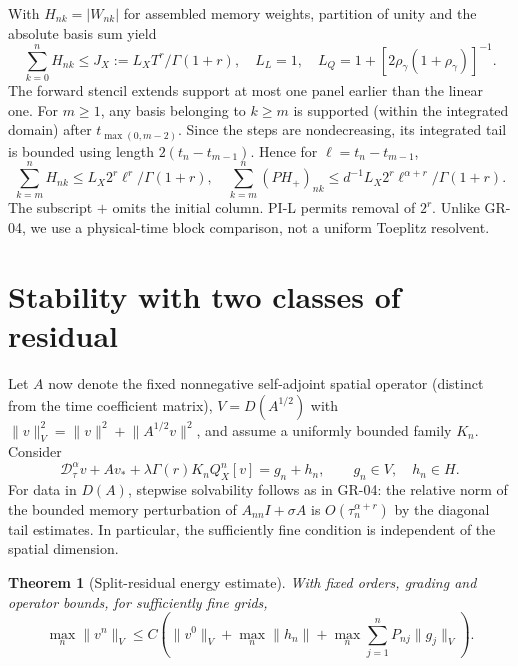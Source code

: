 \documentclass[11pt,a4paper]{article}
\newtheorem{theorem}{Theorem}
\newcommand{\norm}[1]{\lVert#1\rVert}
\newcommand{\D}{\mathcal D_\tau^\alpha}
\begin{document}
With $H_{nk}=|W_{nk}|$ for assembled memory weights, partition of unity and the absolute basis sum yield
\[
 \sum_{k=0}^nH_{nk}\le J_X:=L_X T^r/\Gamma(1+r),\quad L_L=1,\quad L_Q=1+[2\rho_\gamma(1+\rho_\gamma)]^{-1}.
\]
The forward stencil extends support at most one panel earlier than the linear one. For $m\ge1$, any basis belonging to $k\ge m$ is supported (within the integrated domain) after $t_{\max(0,m-2)}$. Since the steps are nondecreasing, its integrated tail is bounded using length $2(t_n-t_{m-1})$. Hence for $\ell=t_n-t_{m-1}$,
\[
 \sum_{k=m}^n H_{nk}\le L_X2^r\ell^r/\Gamma(1+r),\quad
 \sum_{k=m}^n(PH_+)_{nk}\le d^{-1} L_X2^r\ell^{\alpha+r}/\Gamma(1+r).
\]
The subscript $+$ omits the initial column. PI-L permits removal of $2^r$. Unlike GR-04, we use a physical-time block comparison, not a uniform Toeplitz resolvent.
\section{Stability with two classes of residual}
Let $A$ now denote the fixed nonnegative self-adjoint spatial operator (distinct from the time coefficient matrix), $V=D(A^{1/2})$ with $\norm{v}_V^2=\norm{v}^2+\norm{A^{1/2}v}^2$, and assume a uniformly bounded family $K_n$. Consider
\[
 \D v+Av_*+\lambda\Gamma(r)K_n Q_X^n[v]=g_n+h_n,
 \qquad g_n\in V,\quad h_n\in H.
\]
For data in $D(A)$, stepwise solvability follows as in GR-04: the relative norm of the bounded memory perturbation of $A_{nn}I+\sigma A$ is $O(\tau_n^{\alpha+r})$ by the diagonal tail estimates. In particular, the sufficiently fine condition is independent of the spatial dimension.
\begin{theorem}[Split-residual energy estimate]
With fixed orders, grading and operator bounds, for sufficiently fine grids,
\[
 \max_n\norm{v^n}_V\le C\left(\norm{v^0}_V+\max_n\norm{h_n}+\max_n\sum_{j=1}^nP_{nj}\norm{g_j}_V\right).
\]
\end{theorem}
\end{document}
